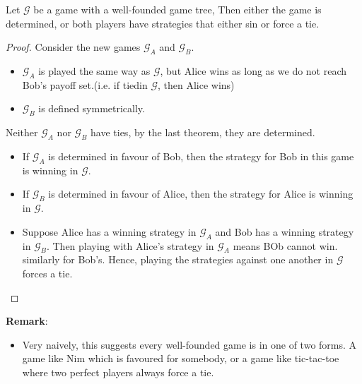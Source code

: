 \begin{theorem}
    Let $\mathcal{G}$ be a game with a well-founded game tree, Then either the game is determined, or both players have strategies that either sin or force a tie.
\end{theorem}
\begin{proof}
    Consider the new games $\mathcal{G}_A$ and $\mathcal{G}_B$.
    \begin{itemize}
        \item $\mathcal{G}_A$ is played the same way as $\mathcal{G}$, but Alice wins as long as we do not reach Bob's payoff set.(i.e. if tiedin $\mathcal{G}$, then Alice wins)
        \item $\mathcal{G}_B$ is defined symmetrically.
    \end{itemize}
    Neither $\mathcal{G}_A$ nor $\mathcal{G}_B$ have ties, by the last theorem, they are determined.
    \begin{itemize}
        \item If $\mathcal{G}_A$ is determined in favour of Bob, then the strategy for Bob in this game is winning in $\mathcal{G}$.
        \item If $\mathcal{G}_B$ is determined in favour of Alice, then the strategy for Alice is winning in $\mathcal{G}$.
        \item Suppose Alice has a winning strategy in $\mathcal{G}_A$ and Bob has a winning strategy in $\mathcal{G}_B$. Then playing with Alice's strategy in $\mathcal{G}_A$ means BOb cannot win. similarly for Bob's. Hence, playing the strategies against one another in $\mathcal{G}$ forces a tie.
    \end{itemize}
\end{proof}
\textbf{Remark}:
\begin{itemize}
    \item Very naively, this suggests every well-founded game is in one of two forms. 
    A game like Nim which is favoured for somebody, or a game like tic-tac-toe where two perfect players always force a tie.
\end{itemize}

